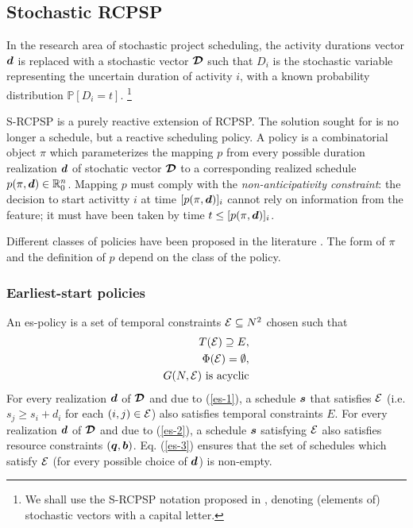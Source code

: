 	\subsection{Stochastic RCPSP}
 	
	In the research area of stochastic project scheduling,
	the activity durations vector $\boldsymbol{d}$ is replaced with a stochastic vector $\boldsymbol{\mathcal{D}}$ such that $D_i$
	is the stochastic variable representing the uncertain duration of activity $i$,
	with a known probability distribution $\mathbb{P}[D_i = t]$.%
	\footnote{We shall use the S-RCPSP notation proposed in \cite{ashtiani2011new},
	denoting (elements of) stochastic vectors with a capital letter.}
			
	S-RCPSP is a purely reactive extension of RCPSP.
	The solution sought for is no longer a schedule, but a reactive scheduling policy. 	
	A policy is a combinatorial object $\pi$ which
	parameterizes the mapping $p$ from every 
	possible duration realization $\boldsymbol{d}$ of stochatic vector $\boldsymbol{\mathcal{D}}$
	to a corresponding realized schedule $p(\pi,\boldsymbol{d}) \in \mathbb{R}^n_0$.
	Mapping $p$ must comply with the \emph{non-anticipativity constraint}:
	the decision to start activitty $i$ at time $[p(\pi,\boldsymbol{d})]_i$ cannot rely on 
	information from the feature; it must have been taken by time $t \leq [p(\pi,\boldsymbol{d})]_i$.
	
	Different classes of policies have been proposed in the literature
	\cite{mohring1984stochastic,mohring1985stochastic,stork2000branch,ashtiani2011new}.
	The form of $\pi$ and the definition of $p$ depend on the class of the policy.
 
 	\subsubsection{Earliest-start policies}
 	
  	An es-policy is a set of temporal constraints $\mathcal{E} \subseteq N^2$ chosen such that
 	\begin{align}
 		T(\mathcal{E}) \supseteq E, \label{es-1} \\
 		\Phi(\mathcal{E}) = \emptyset \label{es-2}, \\
 		G(N,\mathcal{E}) \textrm{ is acyclic} \label{es-3}
 	\end{align}
 	For every realization $\boldsymbol{d}$ of $\boldsymbol{\mathcal{D}}$ and due to (\ref{es-1}),
 	a schedule $\boldsymbol{s}$ that satisfies $\mathcal{E}$
 	(i.e. $s_j \geq s_i + d_i$ for each $(i,j)\in \mathcal{E}$)
 	also satisfies temporal constraints $E$.
  	For every realization $\boldsymbol{d}$ of $\boldsymbol{\mathcal{D}}$ and due to (\ref{es-2}),
 	a schedule $\boldsymbol{s}$ satisfying $\mathcal{E}$ also satisfies resource constraints $(\boldsymbol{q},\boldsymbol{b})$.
 	Eq. (\ref{es-3}) ensures that the
 	set of schedules which satisfy $\mathcal{E}$  (for every possible choice of $\boldsymbol{d}$) is non-empty.
 	
